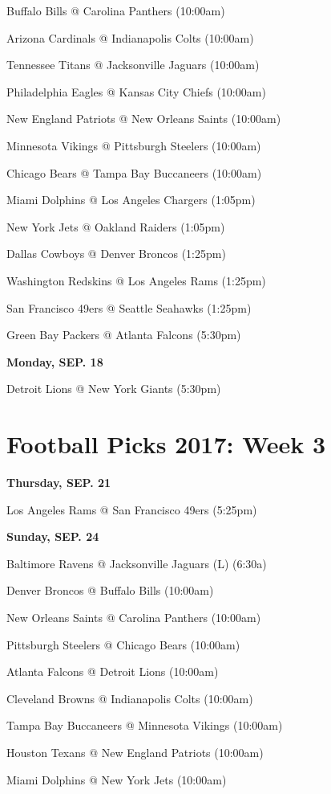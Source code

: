 \documentclass[11pt, letterpaper]{article}
\begin{document}
Buffalo Bills @ Carolina Panthers (10:00am)\par
Arizona Cardinals @ Indianapolis Colts (10:00am)\par
Tennessee Titans @ Jacksonville Jaguars (10:00am)\par
Philadelphia Eagles @ Kansas City Chiefs (10:00am)\par
New England Patriots @ New Orleans Saints (10:00am)\par
Minnesota Vikings @ Pittsburgh Steelers (10:00am)\par
Chicago Bears @ Tampa Bay Buccaneers (10:00am)\par
Miami Dolphins @ Los Angeles Chargers (1:05pm)\par
New York Jets @ Oakland Raiders (1:05pm)\par
Dallas Cowboys @ Denver Broncos (1:25pm)\par
Washington Redskins @ Los Angeles Rams (1:25pm)\par
San Francisco 49ers @ Seattle Seahawks (1:25pm)\par
Green Bay Packers @ Atlanta Falcons (5:30pm)\par
\noindent \normalsize \textbf{Monday, SEP. 18} \par
Detroit Lions @ New York Giants (5:30pm)\par
\newpage \section*{\LARGE Football Picks 2017: Week 3}
\noindent \normalsize \textbf{Thursday, SEP.    21} \par
Los Angeles Rams @ San Francisco 49ers (5:25pm)\par
\noindent \normalsize \textbf{Sunday, SEP. 24} \par
Baltimore Ravens @ Jacksonville Jaguars    (L) (6:30a)\par
Denver Broncos @ Buffalo Bills (10:00am)\par
New Orleans Saints @ Carolina Panthers (10:00am)\par
Pittsburgh Steelers @ Chicago Bears (10:00am)\par
Atlanta Falcons @ Detroit Lions (10:00am)\par
Cleveland Browns @ Indianapolis Colts (10:00am)\par
Tampa Bay Buccaneers @ Minnesota Vikings (10:00am)\par
Houston Texans @ New England Patriots (10:00am)\par
Miami Dolphins @ New York Jets (10:00am)\par
\end{document}
